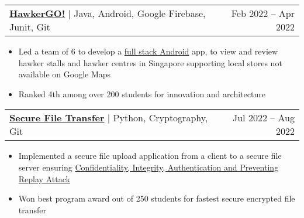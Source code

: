 \documentclass[letterpaper,11pt]{article}
\makeatletter
\newcommand{\resumeItem}[1]{
  \item\small{
    {#1 \vspace{-2.5pt}}
  }
}
\newcommand{\resumeProjectHeading}[2]{
    \item
    \begin{tabular*}{0.97\textwidth}{l@{\extracolsep{\fill}}r}
      \small#1 & \footnotesize#2 \\
    \end{tabular*}\vspace{-7pt}
}
\newcommand{\resumeItemListStart}{\begin{itemize}}
\newcommand{\resumeItemListEnd}{\end{itemize}\vspace{-5pt}}
\makeatother
\begin{document}
          \resumeProjectHeading
           {\href{https://youtu.be/pHnS5BMzTfg} {\faIcon{youtube} }\textbf{{\href{https://github.com/Usgupta/HawkerGO}{\faExternalLink* HawkerGO!}}} $|$ {Java, Android, Google Firebase, Junit, Git}}{\footnotesize	{Feb 2022 -- Apr 2022}}
          
          \resumeItemListStart
            \resumeItem{Led a team of 6 to develop a \ul{full stack Android} app, to view and review hawker stalls and hawker centres in Singapore supporting local stores not available on Google Maps}
            \resumeItem{Ranked 4th among over 200 students for innovation and architecture}
          \resumeItemListEnd

     

                  \resumeProjectHeading
          {\textbf{{\href{https://github.com/Usgupta/pa_2}{\faExternalLink* Secure File Transfer}}} $|$ {Python, Cryptography, Git}}{Jul 2022 -- Aug 2022}
          \resumeItemListStart
          
            \resumeItem{Implemented a secure file upload application from a client to a secure file server ensuring \ul{Confidentiality, Integrity, Authentication and Preventing Replay Attack}}
            \resumeItem{Won best program award out of 250 students for fastest secure encrypted file transfer}
           
          \resumeItemListEnd

          

    
      
\end{document}
